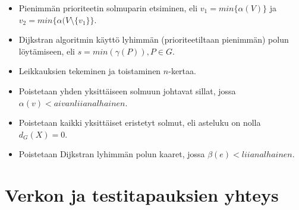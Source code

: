   \begin{itemize}
    \item Pienimmän prioriteetin solmuparin etsiminen, eli \(v_1 = min\{ \alpha(V) \}\) ja \(v_2 = min\{\alpha( V \setminus \{v_1\} \}\).
    \item Dijkstran algoritmin käyttö lyhimmän (prioriteetiltaan pienimmän) polun löytämiseen, eli \(s = min( \gamma(P) ), P \in G\).
    \item Leikkauksien tekeminen ja toistaminen \(n\)-kertaa.
    \item Poistetaan yhden yksittäiseen solmuun johtavat sillat, jossa \(\alpha(v) < aivan liian alhainen \).
    \item Poistetaan kaikki yksittäiset eristetyt solmut, eli asteluku on nolla \(d_G(X) = 0\).
    \item Poistetaan Dijkstran lyhimmän polun kaaret, jossa \(\beta(e) < liian alhainen \).
  \end{itemize}

\section{Verkon ja testitapauksien yhteys} \label{ch:10_verkon_ja_testitapauksien_yhteys}

